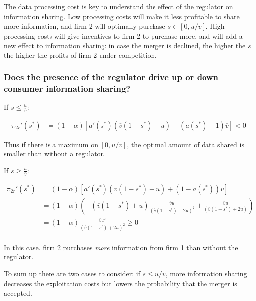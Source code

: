\documentclass[a4paper,leqno]{article}%
\renewcommand{\a}{\alpha}
\newcommand{\ov}{\overline{v}}
\begin{document}
\medskip

The data processing cost is key to understand the effect of the regulator on information sharing. Low processing costs will make it less profitable to share more information, and firm 2 will optimally purchase $s\in[0,u/\ov]$. High processing costs will give incentives to firm 2 to purchase more, and will add a new effect to information sharing: in case the merger is declined, the higher the $s$ the higher the profits of firm 2 under competition.

\medskip

\subsubsection{Does the presence of the regulator drive up or down consumer information sharing?}

If $s\leq\frac{u}{\ov}$:

\begin{equation}
    \begin{aligned}
\pi_{2r}'(s^*)&=(1-\a)[a'(s^*)(\ov(1+s^*)-u)+(a(s^*)-1)\ov]< 0
    \end{aligned}
\end{equation}

Thus if there is a maximum on $[0,u/\ov]$, the optimal amount of data shared is smaller than without a regulator.

\bigskip

If $s\geq\frac{u}{\ov}$:

\begin{equation}
    \begin{aligned}
\pi_{2r}'(s^*)&=(1-\a)[a'(s^*)(\ov(1-s^*)+u)+(1-a(s^*))\ov]\\
            &=(1-\a)(-(\ov(1-s^*)+u)\frac{\ov u}{(\ov(1-s^*)+2u)^2}+\frac{\ov u}{(\ov(1-s^*)+2u)})\\
            &=(1-\a)\frac{\ov u^2}{(\ov(1-s^*)+2u)^2}\geq0\\
\end{aligned}
\end{equation}

\medskip

In this case, firm 2 purchases \textit{more} information from firm 1 than without the regulator. 

To sum up there are two cases to consider: if $s\leq u/ \ov$, more information sharing decreases the exploitation costs but lowers the probability that the merger is accepted.

\medskip
\end{document}

